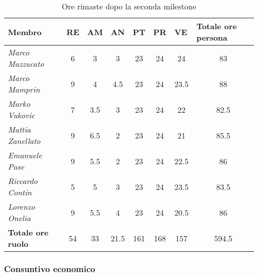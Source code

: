 \begin{table}[!ht]
    \centering
    \begin{tabular}{|l|c|c|c|c|c|c|c|}
    \hline
    \textbf{Membro} & \multicolumn{1}{l|}{\textbf{RE}} & \multicolumn{1}{l|}{\textbf{AM}} & \multicolumn{1}{l|}{\textbf{AN}} & \multicolumn{1}{l|}{\textbf{PT}} & \multicolumn{1}{l|}{\textbf{PR}} & \multicolumn{1}{l|}{\textbf{VE}} & \multicolumn{1}{l|}{\textbf{Totale ore persona}} \\ \hline
    \textit{Marco Mazzucato}  & 6  & 3    & 3    & 23  & 24 & 24     & 83     \\ \hline
    \textit{Marco Mamprin}    & 9  & 4    & 4.5  & 23  & 24 & 23.5   & 88     \\ \hline
    \textit{Marko Vukovic}    & 7  & 3.5  & 3    & 23  & 24 & 22     & 82.5   \\ \hline
    \textit{Mattia Zanellato} & 9  & 6.5  & 2    & 23  & 24 & 21     & 85.5   \\ \hline
    \textit{Emanuele Pase}    & 9  & 5.5  & 2    & 23  & 24 & 22.5   & 86     \\ \hline
    \textit{Riccardo Contin}  & 5  & 5    & 3    & 23  & 24 & 23.5   & 83.5   \\ \hline
    \textit{Lorenzo Onelia}   & 9  & 5.5  & 4    & 23  & 24 & 20.5   & 86     \\ \hline
    \textbf{Totale ore ruolo} & 54 & 33   & 21.5 & 161 & 168& 157    & 594.5  \\ \hline
    \end{tabular}
    \caption{Ore rimaste dopo la seconda milestone}
\end{table}

\subsubsection{Consuntivo economico}

